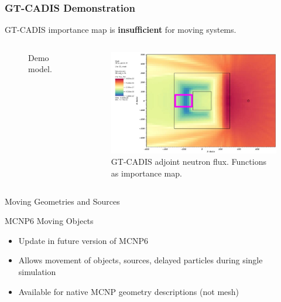 \documentclass{beamer}
\begin{document}
\begin{frame}
\frametitle{GT-CADIS Demonstration}
	GT-CADIS importance map is \textbf{insufficient} for moving systems.

	\begin{columns}
        \begin{figure}
	\vspace{-0.9cm}
		\hspace{-1cm}
		\caption{Demo model.}
        \end{figure}

        \begin{figure}
	\centering
	\includegraphics[scale=0.20]{gtcadis_adjn_hi.jpg}
		\caption{GT-CADIS adjoint neutron flux. Functions as importance
		map.}
	\end{figure}
	\end{columns}

\end{frame}



\begin{frame}{Moving Geometries and Sources}
	\begin{block}{MCNP6 Moving Objects}
	\begin{itemize}
		\item{Update in future version of MCNP6}
		\item{Allows movement of objects, sources, delayed particles
			during single simulation}
		\item{Available for native MCNP geometry descriptions (not
			mesh)}
	\end{itemize}
	\end{block}
\end{frame}
\end{document}
